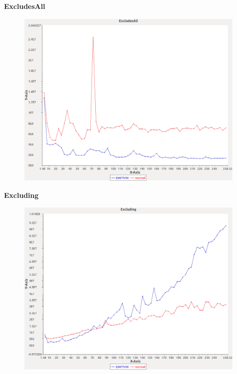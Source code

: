 \noindent\textbf{ExcludesAll}

\begin{figure}[h]
\centering
\includegraphics[width=\textwidth]{../graphs/set/ExcludesAll}
\end{figure}
\pagebreak

\noindent\textbf{Excluding}

\begin{figure}[h]
\centering
\includegraphics[width=\textwidth]{../graphs/set/Excluding}
\end{figure}
\pagebreak


